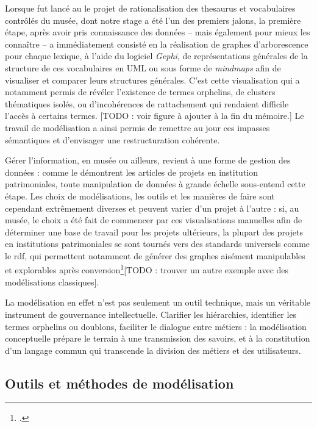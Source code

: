 Lorsque fut lancé au \mae le projet de rationalisation des \gls{thesaurus} et vocabulaires contrôlés du musée, dont notre stage a été l'un des premiers jalons, la première étape, après avoir pris connaissance des données -- mais également pour mieux les connaître -- a immédiatement consisté en la réalisation de graphes d’arborescence pour chaque lexique, à l’aide du logiciel \textit{Gephi}, de représentations générales de la structure de ces vocabulaires en UML ou sous forme de \textit{mindmaps} afin de visualiser et comparer leurs structures générales. C'est cette visualisation qui a notamment permis de révéler l’existence de termes orphelins, de clusters thématiques isolés, ou d’incohérences de rattachement qui rendaient difficile l'accès à certains termes. [TODO : voir figure à ajouter à la fin du mémoire.] Le travail de modélisation a ainsi permis de remettre au jour ces impasses sémantiques et d’envisager une restructuration cohérente.

Gérer l'information, en musée ou ailleurs, revient à une forme de gestion des données : comme le démontrent les articles de projets en institution patrimoniales, toute manipulation de données à grande échelle sous-entend cette étape. Les choix de modélisations, les outils et les manières de faire sont cependant extrêmement diverses et peuvent varier d'un projet à l'autre : si, au musée, le choix a été fait de commencer par ces visualisations manuelles afin de déterminer une base de travail pour les projets ultérieurs, la plupart des projets en institutions patrimoniales se sont tournés vers des standards universels comme le \ac{rdf}, qui permettent notamment de générer des graphes aisément manipulables et explorables après conversion\footcite{bermesCasLierDonnees2013a,bermesConvergenceInteroperabiliteLapport2011,filabesLindexationRAMEAUAssistee2025,reichThesaurusAuGraphe2022}[TODO : trouver un autre exemple avec des modélisations classiques].


La modélisation en effet n'est pas seulement un outil technique, mais un véritable instrument de gouvernance intellectuelle. Clarifier les hiérarchies, identifier les termes orphelins ou doublons, faciliter le dialogue entre métiers : la modélisation conceptuelle prépare le terrain à une transmission des savoirs, et à la constitution d’un langage commun qui transcende la division des métiers et des utilisateurs.


\subsection{Outils et méthodes de modélisation}


